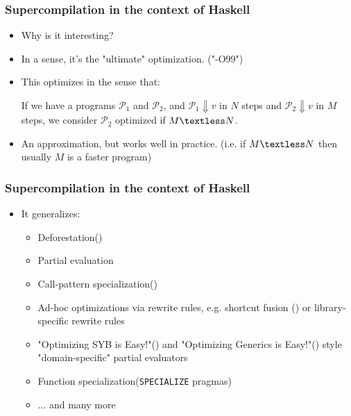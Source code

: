 \documentclass{beamer}
\begin{document}
\begin{frame}
    \frametitle{Supercompilation in the context of Haskell}

    \begin{itemize}
        \item
            Why is it interesting?
        \item
            In a sense, it's the "ultimate" optimization. ("-O99")
        \item
            This optimizes in the sense that:

            If we have a programs $\mathcal{P}_1$ and $\mathcal{P}_2$, and
            \newline
            $\mathcal{P}_1 \Downarrow v$ in $N$ steps and \newline
            $\mathcal{P}_2 \Downarrow v$ in $M$ steps, \newline
            we consider $\mathcal{P}_2$ optimized if $M \textless N$.
        \item
            An approximation, but works well in practice.
            \newline
            (i.e. if $M \textless N$ then usually $M$ is a faster program)
    \end{itemize}
\end{frame}


\begin{frame}
    \frametitle{Supercompilation in the context of Haskell}

    \begin{itemize}
        \item[]
            It generalizes:
            \begin{itemize}
                \item
                    Deforestation(\citet{deforestation})
                \item
                    Partial evaluation
                \item
                    Call-pattern specialization(\citet{callpatternspec})
                \item
                    Ad-hoc optimizations via rewrite rules, e.g. shortcut fusion
                    (\citet{shortcutdeforestation}) or library-specific rewrite
                    rules
                \item
                    "Optimizing SYB is Easy!"(\citet{optimizingsyb}) and
                    "Optimizing Generics is Easy!"(\citet{optimizinggenerics})
                    style "domain-specific" partial evaluators
                \item
                    Function specialization(\texttt{SPECIALIZE} pragmas)
                \item
                    ... and many more
            \end{itemize}
    \end{itemize}
\end{frame}
\end{document}
